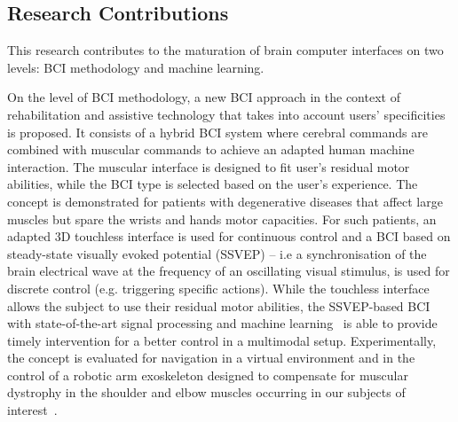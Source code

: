 
\subsection{Research Contributions}
This research contributes to the maturation of brain computer interfaces on two levels: BCI methodology and machine learning.

On the level of BCI methodology,
a new BCI approach in the context of rehabilitation and assistive technology that takes into account users' specificities is proposed.      
It consists of a hybrid BCI system where cerebral commands are combined with muscular commands to achieve an adapted human machine interaction.
The muscular interface is designed to fit user's residual motor abilities, while the BCI type is selected based on the user's experience.
The concept is demonstrated for patients with degenerative diseases that affect large muscles but spare the wrists and hands motor capacities.
For such patients,  
an adapted 3D touchless interface is used for continuous control and a BCI based on steady-state visually evoked potential (SSVEP) -- i.e a synchronisation of the brain electrical wave at the frequency of an oscillating visual stimulus,  is used for discrete control (e.g. triggering specific actions).   
While the touchless interface allows the subject to use their residual motor abilities, the SSVEP-based BCI with state-of-the-art signal processing and machine learning~\citep{kalunga_ssvep_2013} is able to provide timely intervention for a better control in a multimodal setup. 
Experimentally, the concept is evaluated for navigation in a virtual environment and in the control of a robotic arm exoskeleton designed to compensate for muscular dystrophy in the shoulder and elbow muscles occurring in our subjects of interest~\citep{kalunga_hybrid_2014}.

